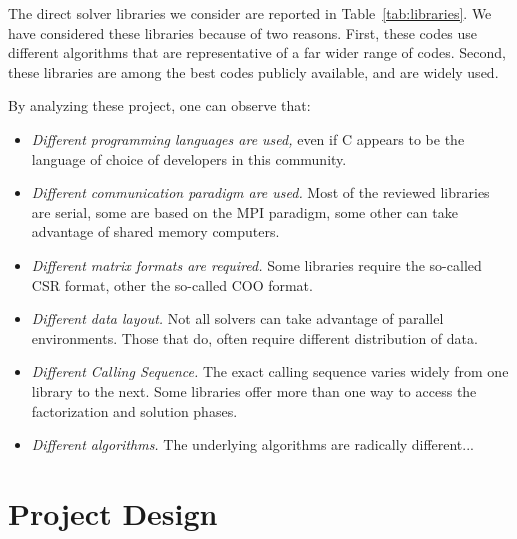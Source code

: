 \documentclass[acmtocl]{acmtrans2m}
\begin{document}
The direct solver libraries we consider are reported in
Table~\ref{tab:libraries}. We have considered these libraries because of two
reasons.
First, these codes use different algorithms that are
representative of a far wider range of codes. Second, these libraries are
among the best codes publicly available, and are widely used. 

By analyzing these project, one can observe that:
\begin{itemize}
\item {\sl Different programming languages are used,}  even if C appears to be
  the language of choice of developers in this community.

\item {\sl Different communication paradigm are used.} 
 Most of the reviewed libraries are serial, some are based on the MPI
 paradigm, some other can take advantage of shared memory computers.

\item {\sl Different matrix formats are required.} Some libraries require the
so-called CSR format, other the so-called COO format. 

\item {\sl Different data layout.} Not all solvers can take advantage of
parallel environments. Those that do, often require different distribution of
data. 

\item {\sl Different Calling Sequence.} The exact calling sequence varies
widely from one library to the next.  Some libraries offer more than one way
to access the factorization and solution phases.

\item {\sl Different algorithms.} The underlying algorithms are radically
different...

\end{itemize}

\section{Project Design}
\label{sec:design}
\end{document}
